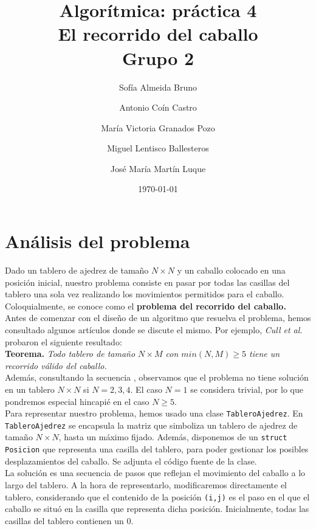 \documentclass[11pt]{article}
\title{Algorítmica: práctica 4 \\ \large El recorrido del caballo\\ \vspace{0.2em}Grupo 2}
\author{Sofía Almeida Bruno \and Antonio Coín Castro \and María Victoria Granados Pozo \and Miguel Lentisco Ballesteros \and José María Martín Luque}
\date{\today}
\begin{document}
\maketitle

\newpage

\section*{Análisis del problema}

Dado un tablero de ajedrez de tamaño $N\times N$ y un caballo colocado en una posición inicial, nuestro problema consiste en pasar por todas las casillas del tablero una sola vez realizando los movimientos permitidos para el caballo. Coloquialmente, se conoce como el \textbf{problema del recorrido del caballo.}\\

Antes de comenzar con el diseño de un algoritmo que resuelva el problema, hemos consultado algunos artículos donde se discute el mismo. Por ejemplo, \textit{Cull et al.} \cite{cull} probaron el siguiente resultado:\\

\textbf{Teorema.} \textit{Todo tablero de tamaño $N\times M$ con $	min(N,M)\ge5$ tiene un recorrido válido del caballo.}\\

Además, consultando la secuencia \cite{sequence}, observamos que el problema no tiene solución en un tablero $N\times N$ si $N=2,3,4$. El caso $N=1$ se considera trivial, por lo que pondremos especial hincapié en el caso $N\ge5$.\\

Para representar nuestro problema, hemos usado una clase \verb|TableroAjedrez|. En \verb|TableroAjedrez| se encapsula la matriz que simboliza un tablero de ajedrez de tamaño $N\times N$, hasta un máximo fijado. Además, disponemos de un \verb|struct Posicion| que representa una casilla del tablero, para poder gestionar los posibles desplazamientos del caballo. Se adjunta el código fuente de la clase.\\

La solución es una secuencia de pasos que reflejan el movimiento del caballo a lo largo del tablero. A la hora de representarlo, modificaremos directamente el tablero, considerando que el contenido de la posición \verb|(i,j)| es el paso en el que el caballo se situó en la casilla que representa dicha posición. Inicialmente, todas las casillas del tablero contienen un $0$.
\end{document}
